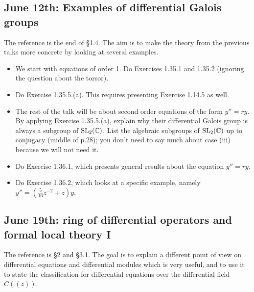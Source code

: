 \documentclass{amsart}
\theoremstyle{definition}
\theoremstyle{remark}
\newcommand{\BC}{{\mathbb{C}}}
\newcommand{\SL}{{\rm SL}}
\begin{document}
\subsection{June 12th: Examples of differential Galois groups}

The reference is the end of \S 1.4. The aim is to make the theory from the previous talks more concrete by looking at several examples.

\begin{itemize}
\item We start with equations of order 1. Do Exercises 1.35.1 and 1.35.2 (ignoring the question about the torsor).
\item Do Exercise 1.35.5.(a). This requires presenting Exercise 1.14.5 as well.
\item The rest of the talk will be about second order equations of the form \(y''=ry\). By applying Exercise 1.35.5.(a), explain why their differential Galois group is always a subgroup of \(\SL_{2}(\BC)\). List the algebraic subgroups of \(\SL_{2}(\BC)\) up to conjugacy (middle of p.28); you don't need to say much about case (iii) because we will not need it.
\item Do Exercise 1.36.1, which presents general results about the equation \(y''=ry\).
\item Do Exercise 1.36.2, which looks at a specific example, namely \(y''=(\frac{5}{16}z^{-2}+z)y\).
\end{itemize}

\subsection{June 19th: ring of differential operators and formal local theory I}

The reference is \S 2 and \S 3.1. The goal is to explain a different point of view on differential equations and differential modules which is very useful, and to use it to state the classification for differential equations over the differential field \(C((z))\).
\end{document}
